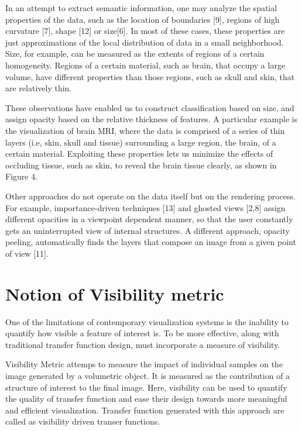 In an attempt to extract semantic information, one may analyze the spatial properties of the data, such as the location of boundaries [9], regions of high curvature [7], shape [12] or size[6]. In most of these cases, these properties are just approximations of the local distribution of data in a small neighborhood. Size, for example, can be measured as the extents of regions of a certain homogeneity. Regions of a certain material, such as brain, that occupy a large volume, have different properties than those regions, such as skull and
skin, that are relatively thin.

These observations have enabled us to construct classification based on size, and assign opacity based on the relative thickness of features. A particular example is the visualization of brain MRI, where the data is comprised of a series of thin layers (i.e, skin, skull and tissue) surrounding a large region, the brain, of a certain material. Exploiting these properties lets us minimize the effects of occluding tissue, such as skin, to reveal the brain tissue clearly, as shown in Figure 4.

Other approaches do not operate on the data itself but on the rendering process. For example, importance-driven techniques [13] and ghosted views [2,8] assign different opacities in a viewpoint dependent manner, so that the user constantly gets an uninterrupted view of internal structures. A different approach, opacity peeling, automatically finds the layers that compose an image from a given point of view [11].

\section{Notion of Visibility metric} 

One of the limitations of contemporary visualization systems is the inability to quantify how visible a feature of interest is. To be more effective, along with traditional transfer function design, must incorporate a measure of visibility. 

Visibility Metric attemps to measure the impact of individual samples on the image generated by a volumetric object. It is measured as the contribution of a structure of interest to the final image. Here, visibility can be used to quantify the quality of transfer function and ease their design towards more meaningful and efficient visualization. Transfer function generated with this approach are called as visibility driven transer functions.

